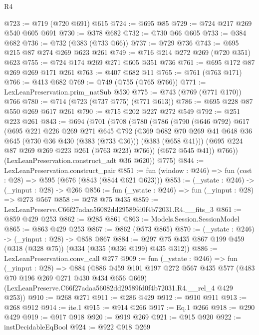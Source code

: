 \begin{lexlean}{R4}
\begin{coremodule}
@723 := @719 (@720 @691) @615
@724 := @695 @85
@729 := @724 @217 @269 @540 @605 @691
@730 := @378 @682
@732 := @730 @66 @605
@733 := @384 @682
@736 := @732 (@383 (@733 @66))
@737 := @729 @736
@743 := @695 @215 @87 @274 @269 @623 @261
@749 := @716 @214 @272 @269 (@720 @351) @623
@755 := @724 @174 @269 @271 @605 @351 @736
@761 := @695 @172 @87 @269 @269 @171 @261
@763 := @407 @682 @11
@765 := @761 (@763 @171)
@766 := @413 @682
@769 := @749 (@755 (@765 @766))
@771 := LexLeanPreservation.prim_natSub @530
@775 := @743 (@769 (@771 @170)) @766
@780 := @714 (@723 (@737 @775) (@771 @613))
@786 := @695 @228 @87 @550 @269 @617 @261
@790 := @715 @202 @227 @272 @549
@792 := @251 @223 @261
@843 := @694
    (@701
      (@708
        (@780
          (@786
            (@790
              (@646 @792)
              @617
              (@695
                @221
                @226
                @269
                @271
                @645
                @792
                (@369
                  @682
                  @70
                  @269
                  @41
                  @648
                  @36
                  @645
                  (@730 @36 @430 (@383 (@733 @36)))
                  (@383 (@658 @41)))
                (@695 @224 @87 @269 @269 @223 @261 (@763 @223) @766))
              (@672 @545 @41))
            @766))
        (LexLeanPreservation.construct_adt @36 @620))
      @775)
@844 := LexLeanPreservation.construct_pair
@851 := fun (window : @246) => fun (cost : @28) => @595 (@676 (@843 (@844 @621 @623)))
@853 := (_ystate : @246) -> (_yinput : @28) -> @266
@856 := fun (_ystate : @246) => fun (_yinput : @28) => @273 @567
@858 := @278 @75 @435
@859 := LexLeanPreserve.C66f27adaa56082dd29589fd0f4b72031.R4.__fits_3
@861 := @859 @429 @253
@862 := @285 @861
@863 := Models.Session.SessionModel
@865 := @863 @429 @253
@867 := @862 (@573 @865)
@870 := (_ystate : @246) -> (_yinput : @28) -> @858 @867
@884 := @297 @75 @435 @867 @199 @459 (@318 (@328 @75)) (@334 (@335 (@336 @199) @435 @312))
@886 := LexLeanPreservation.conv_call @277
@909 := fun (_ystate : @246) =>
  fun (_yinput : @28) =>
  @884
    (@886
      @459
      @101
      @197
      @272
      @567
      @435
      @577
      (@483 @70 @196 @269 @271 @430 @434 @656 @669)
      (LexLeanPreserve.C66f27adaa56082dd29589fd0f4b72031.R4.__rel_4 @429 @253))
@910 := @268 @271
@911 := @286 @429
@912 := @910 @911
@913 := @268 @912
@914 := ite.{1}
@915 := @914 @266
@917 := Eq.{1} @266
@918 := @290 @429
@919 := @917 @918
@920 := @919 @269
@921 := @915 @920
@922 := instDecidableEqBool
@924 := @922 @918 @269

\end{coremodule}
\end{lexlean}
